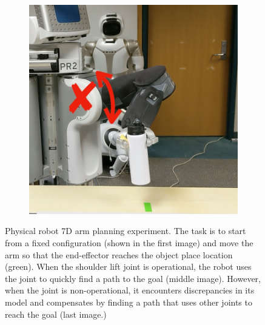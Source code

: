 \begin{figure}[t]
\begin{subfigure}{0.3\linewidth}
  \end{subfigure}
  \begin{subfigure}{0.3\linewidth}
    \includegraphics[width=\linewidth]{figures/cmax/pr2_place_broken_final_annotated_thicker.jpg}
  \end{subfigure}
  \caption{Physical robot 7D arm planning experiment. The task is to start
  from a fixed configuration (shown in the first image) and move the
  arm so that the end-effector reaches the object place location
  (green). When the shoulder lift joint is operational, the robot uses
  the joint to quickly find a path to the goal (middle image). However, when the
  joint is non-operational, it encounters discrepancies in its model
  and compensates by finding a path that uses other joints to reach
  the goal (last image.)}
\label{fig:real-7d}

\end{figure}

